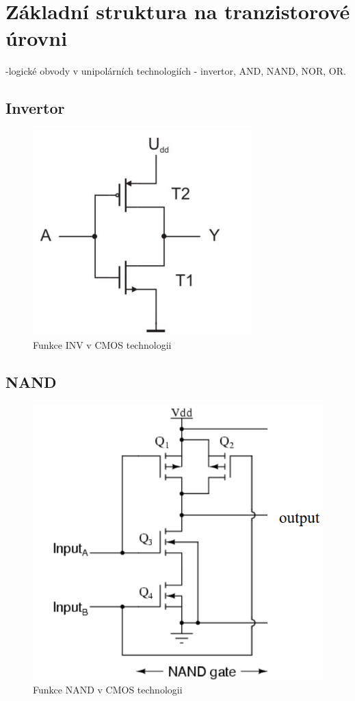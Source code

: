 \section{Základní struktura na tranzistorové úrovni }
-logické obvody v unipolárních technologiích - invertor, AND, NAND, NOR, OR.

\subsection{Invertor}
   \begin{figure}[h]
   \begin{center}
     \includegraphics[scale=0.6]{images/INVCMOS.png}
   \end{center}
   \caption{Funkce INV v CMOS technologii}
  \end{figure}
   \pagebreak
\subsection{NAND}
   \begin{figure}[h]
   \begin{center}
     \includegraphics[scale=0.6]{images/NANDCMOS.png}
   \end{center}
   \caption{Funkce NAND v CMOS technologii}
  \end{figure}
 \pagebreak
